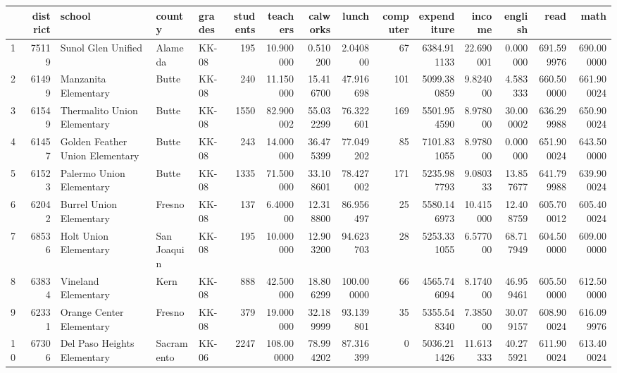\begin{tabular}{lrlllrrrrrrrrrr}
\toprule
{} &  district &                           school &       county & grades &  students &    teachers &   calworks &       lunch &  computer &  expenditure &     income &    english &        read &        math \\
\midrule
1  &     75119 &               Sunol Glen Unified &      Alameda &  KK-08 &       195 &   10.900000 &   0.510200 &    2.040800 &        67 &  6384.911133 &  22.690001 &   0.000000 &  691.599976 &  690.000000 \\
2  &     61499 &             Manzanita Elementary &        Butte &  KK-08 &       240 &   11.150000 &  15.416700 &   47.916698 &       101 &  5099.380859 &   9.824000 &   4.583333 &  660.500000 &  661.900024 \\
3  &     61549 &      Thermalito Union Elementary &        Butte &  KK-08 &      1550 &   82.900002 &  55.032299 &   76.322601 &       169 &  5501.954590 &   8.978000 &  30.000002 &  636.299988 &  650.900024 \\
4  &     61457 &  Golden Feather Union Elementary &        Butte &  KK-08 &       243 &   14.000000 &  36.475399 &   77.049202 &        85 &  7101.831055 &   8.978000 &   0.000000 &  651.900024 &  643.500000 \\
5  &     61523 &         Palermo Union Elementary &        Butte &  KK-08 &      1335 &   71.500000 &  33.108601 &   78.427002 &       171 &  5235.987793 &   9.080333 &  13.857677 &  641.799988 &  639.900024 \\
6  &     62042 &          Burrel Union Elementary &       Fresno &  KK-08 &       137 &    6.400000 &  12.318800 &   86.956497 &        25 &  5580.146973 &  10.415000 &  12.408759 &  605.700012 &  605.400024 \\
7  &     68536 &            Holt Union Elementary &  San Joaquin &  KK-08 &       195 &   10.000000 &  12.903200 &   94.623703 &        28 &  5253.331055 &   6.577000 &  68.717949 &  604.500000 &  609.000000 \\
8  &     63834 &              Vineland Elementary &         Kern &  KK-08 &       888 &   42.500000 &  18.806299 &  100.000000 &        66 &  4565.746094 &   8.174000 &  46.959461 &  605.500000 &  612.500000 \\
9  &     62331 &         Orange Center Elementary &       Fresno &  KK-08 &       379 &   19.000000 &  32.189999 &   93.139801 &        35 &  5355.548340 &   7.385000 &  30.079157 &  608.900024 &  616.099976 \\
10 &     67306 &      Del Paso Heights Elementary &   Sacramento &  KK-06 &      2247 &  108.000000 &  78.994202 &   87.316399 &         0 &  5036.211426 &  11.613333 &  40.275921 &  611.900024 &  613.400024 \\
\bottomrule
\end{tabular}
